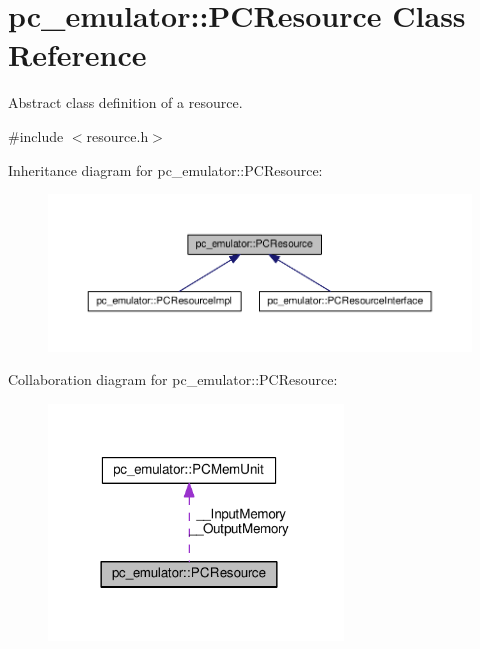 \hypertarget{classpc__emulator_1_1PCResource}{}\section{pc\+\_\+emulator\+:\+:P\+C\+Resource Class Reference}
\label{classpc__emulator_1_1PCResource}


Abstract class definition of a resource.  




{\ttfamily \#include $<$resource.\+h$>$}



Inheritance diagram for pc\+\_\+emulator\+:\+:P\+C\+Resource\+:
\nopagebreak
\begin{figure}[H]
\begin{center}
\leavevmode
\includegraphics[width=350pt]{classpc__emulator_1_1PCResource__inherit__graph}
\end{center}
\end{figure}


Collaboration diagram for pc\+\_\+emulator\+:\+:P\+C\+Resource\+:\nopagebreak
\begin{figure}[H]
\begin{center}
\leavevmode
\includegraphics[width=222pt]{classpc__emulator_1_1PCResource__coll__graph}
\end{center}
\end{figure}
